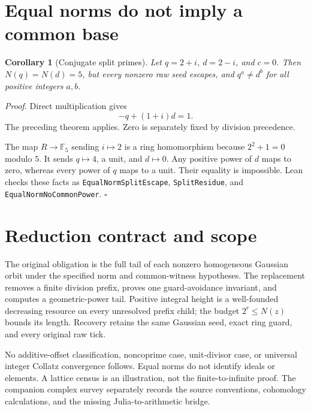\documentclass[11pt,letterpaper]{article}
\newtheorem{corollary}[theorem]{Corollary}
\newenvironment{proof}{\noindent\textit{Proof.}}{\hfill\(\square\)}
\begin{document}
\section{Equal norms do not imply a common base}

\begin{corollary}[Conjugate split primes]
Let \(q=2+i\), \(d=2-i\), and \(c=0\). Then \(N(q)=N(d)=5\), but every nonzero raw seed escapes, and \(q^a\ne d^b\) for all positive integers \(a,b\).
\end{corollary}
\begin{proof}
Direct multiplication gives
\[
-q+(1+i)d=1.
\]
The preceding theorem applies. Zero is separately fixed by division precedence.

The map \(R\to\mathbb F_5\) sending \(i\mapsto2\) is a ring homomorphism because \(2^2+1=0\) modulo \(5\). It sends \(q\mapsto4\), a unit, and \(d\mapsto0\). Any positive power of \(d\) maps to zero, whereas every power of \(q\) maps to a unit. Their equality is impossible. Lean checks these facts as \texttt{EqualNormSplitEscape}, \texttt{SplitResidue}, and \texttt{EqualNormNoCommonPower}.
\end{proof}

\section{Reduction contract and scope}

The original obligation is the full tail of each nonzero homogeneous Gaussian orbit under the specified norm and common-witness hypotheses. The replacement removes a finite division prefix, proves one guard-avoidance invariant, and computes a geometric-power tail. Positive integral height is a well-founded decreasing resource on every unresolved prefix child; the budget \(2^r\le N(z)\) bounds its length. Recovery retains the same Gaussian seed, exact ring guard, and every original raw tick.

No additive-offset classification, noncoprime case, unit-divisor case, or universal integer Collatz convergence follows. Equal norms do not identify ideals or elements. A lattice census is an illustration, not the finite-to-infinite proof. The companion complex survey separately records the source conventions, cohomology calculations, and the missing Julia-to-arithmetic bridge.
\end{document}
